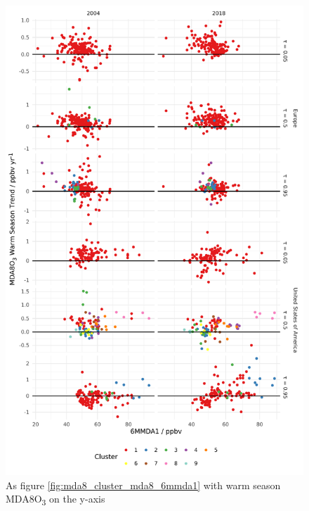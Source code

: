 \documentclass[journal abbreviation, manuscript]{copernicus}
\begin{document}
\begin{figure}[p]
\centering
\includegraphics[height=0.9\textheight]{figures/paper_figures/f14_mda8_warm_cluster_mda8_6mmda1.pdf}
\caption{As figure \ref{fig:mda8_cluster_mda8_6mmda1} with warm season MDA8O\textsubscript{3} on the y-axis}
\label{fig:mda8_warm_cluster_mda8_6mmda1}
\end{figure}
\clearpage
\end{document}
